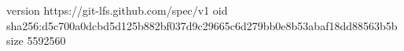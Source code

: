 version https://git-lfs.github.com/spec/v1
oid sha256:d5c700a0dcbd5d125b882bf037d9c29665c6d279bb0e8b53abaf18dd88563b5b
size 5592560
